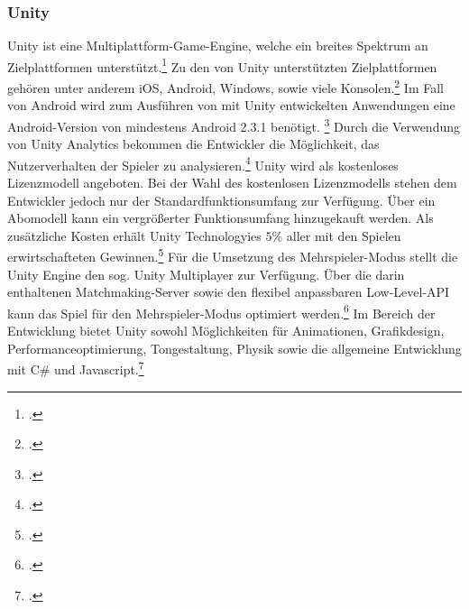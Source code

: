 	\subsubsection*{Unity}
	Unity ist eine Multiplattform-Game-Engine, welche ein breites Spektrum an Zielplattformen unterstützt.\footcite[\url{https://unity3d.com/de/unity}]{unity-home} Zu den von Unity unterstützten Zielplattformen gehören unter anderem iOS, Android, Windows, sowie viele Konsolen.\footcite[\url{https://unity3d.com/de/unity/multiplatform}]{unity-home} Im Fall von Android wird zum Ausführen von mit Unity entwickelten Anwendungen eine Android-Version von mindestens Android 2.3.1 benötigt. \footcite[\url{https://unity3d.com/de/unity/system-requirements}]{unity-home} Durch die Verwendung von Unity Analytics bekommen die Entwickler die Möglichkeit, das Nutzerverhalten der Spieler zu analysieren.\footcite[\url{https://unity3d.com/de/services/analytics}]{unity-home} Unity wird als kostenloses Lizenzmodell angeboten. Bei der Wahl des kostenlosen Lizenzmodells stehen dem Entwickler jedoch nur der Standardfunktionsumfang zur Verfügung. Über ein Abomodell kann ein vergrößerter Funktionsumfang hinzugekauft werden. Als zusätzliche Kosten erhält Unity Technologyies $5$\% aller mit den Spielen erwirtschafteten Gewinnen.\footcite[\url{https://store.unity.com/de}]{unity-home}
	Für die Umsetzung des Mehrspieler-Modus stellt die Unity Engine den sog. Unity Multiplayer zur Verfügung. Über die darin enthaltenen Matchmaking-Server sowie den flexibel anpassbaren Low-Level-API kann das Spiel für den Mehrspieler-Modus optimiert werden.\footcite[\url{https://unity3d.com/de/services/multiplayer}]{unity-home}
	Im Bereich der Entwicklung bietet Unity sowohl Möglichkeiten für Animationen, Grafikdesign, Performanceoptimierung, Tongestaltung, Physik sowie die allgemeine Entwicklung mit C\# und Javascript.\footcite[\url{https://unity3d.com/de/unity/editor}]{unity-home}

